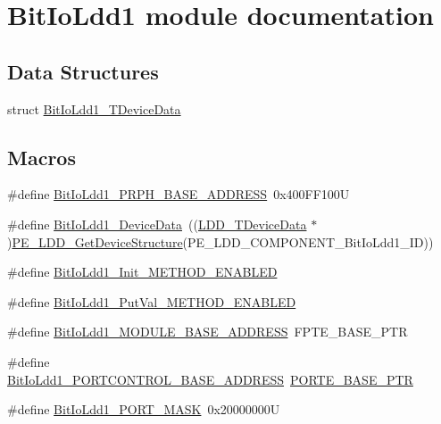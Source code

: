 \hypertarget{group___bit_io_ldd1__module}{}\section{Bit\+Io\+Ldd1 module documentation}
\label{group___bit_io_ldd1__module}
\subsection*{Data Structures}
\begin{DoxyCompactItemize}
\item 
struct \hyperlink{struct_bit_io_ldd1___t_device_data}{Bit\+Io\+Ldd1\+\_\+\+T\+Device\+Data}
\end{DoxyCompactItemize}
\subsection*{Macros}
\begin{DoxyCompactItemize}
\item 
\#define \hyperlink{group___bit_io_ldd1__module_gaf1c1ab314890f91862048712f6ee0270}{Bit\+Io\+Ldd1\+\_\+\+P\+R\+P\+H\+\_\+\+B\+A\+S\+E\+\_\+\+A\+D\+D\+R\+E\+SS}~0x400\+F\+F100U
\item 
\#define \hyperlink{group___bit_io_ldd1__module_ga87620b3d6d232d352b6cd29d865efc18}{Bit\+Io\+Ldd1\+\_\+\+Device\+Data}~((\hyperlink{group___p_e___types__module_gac5cf1362f1f0e3a2ce71b1bf2276d091}{L\+D\+D\+\_\+\+T\+Device\+Data} $\ast$)\hyperlink{group___p_e___types__module_gaa1c23d559daef5bcd3327ca83fb56f5a}{P\+E\+\_\+\+L\+D\+D\+\_\+\+Get\+Device\+Structure}(P\+E\+\_\+\+L\+D\+D\+\_\+\+C\+O\+M\+P\+O\+N\+E\+N\+T\+\_\+\+Bit\+Io\+Ldd1\+\_\+\+ID))
\item 
\#define \hyperlink{group___bit_io_ldd1__module_ga7769c2e2e3019fc5591e23fcf27a8c4b}{Bit\+Io\+Ldd1\+\_\+\+Init\+\_\+\+M\+E\+T\+H\+O\+D\+\_\+\+E\+N\+A\+B\+L\+ED}
\item 
\#define \hyperlink{group___bit_io_ldd1__module_ga89568b3744bdb9e4b9617d13138b1046}{Bit\+Io\+Ldd1\+\_\+\+Put\+Val\+\_\+\+M\+E\+T\+H\+O\+D\+\_\+\+E\+N\+A\+B\+L\+ED}
\item 
\#define \hyperlink{group___bit_io_ldd1__module_ga37d85f4c3dfac62a113e7fbc733c6ec1}{Bit\+Io\+Ldd1\+\_\+\+M\+O\+D\+U\+L\+E\+\_\+\+B\+A\+S\+E\+\_\+\+A\+D\+D\+R\+E\+SS}~F\+P\+T\+E\+\_\+\+B\+A\+S\+E\+\_\+\+P\+TR
\item 
\#define \hyperlink{group___bit_io_ldd1__module_gaaba32f43815123de9da736bfa1c2d593}{Bit\+Io\+Ldd1\+\_\+\+P\+O\+R\+T\+C\+O\+N\+T\+R\+O\+L\+\_\+\+B\+A\+S\+E\+\_\+\+A\+D\+D\+R\+E\+SS}~\hyperlink{group___p_o_r_t___peripheral_gab166fe285bbb15b52de610f408fe25d3}{P\+O\+R\+T\+E\+\_\+\+B\+A\+S\+E\+\_\+\+P\+TR}
\item 
\#define \hyperlink{group___bit_io_ldd1__module_ga5a1122093477fddb4e3686d1410cbb46}{Bit\+Io\+Ldd1\+\_\+\+P\+O\+R\+T\+\_\+\+M\+A\+SK}~0x20000000U
\end{DoxyCompactItemize}
